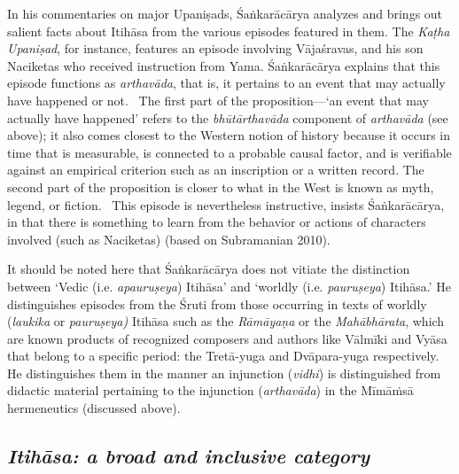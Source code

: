 In his commentaries on major Upaniṣads, Śaṅkarācārya analyzes and brings out salient facts about Itihāsa from the various episodes featured in them. The \textit{Kaṭha Upaniṣad}, for instance, features an episode involving Vājaśravas, and his son Naciketas who received instruction from Yama. Śaṅkarācārya explains that this episode functions as \textit{arthavāda}, that is, it pertains to an event that may actually have happened or not.  The first part of the proposition—‘an event that may actually have happened’ refers to the \textit{bhūtārthavāda} component of \textit{arthavāda} (see above); it also comes closest to the Western notion of history because it occurs in time that is measurable, is connected to a probable causal factor, and is verifiable against an empirical criterion such as an inscription or a written record. The second part of the proposition is closer to what in the West is known as myth, legend, or fiction.  This episode is nevertheless instructive, insists Śaṅkarācārya, in that there is something to learn from the behavior or actions of characters involved (such as Naciketas) (based on Subramanian 2010). 

It should be noted here that Śaṅkarācārya does not vitiate the distinction between ‘Vedic (i.e. \textit{apauruṣeya}) Itihāsa’ and ‘worldly (i.e. \textit{pauruṣeya}) Itihāsa.’ He distinguishes episodes from the Śruti from those occurring in texts of worldly (\textit{laukika} or \textit{pauruṣeya)} Itihāsa such as the \textit{Rāmāyaṇa} or the \textit{Mahābhārata}, which are known products of recognized composers and authors like Vālmīki and Vyāsa that belong to a specific period: the Tretā-yuga and Dvāpara-yuga respectively. He distinguishes them in the manner an injunction (\textit{vidhi}) is distinguished from didactic material pertaining to the injunction (\textit{arthavāda}) in the Mīmāṁsā hermeneutics (discussed above).


\subsection*{\textit{Itihāsa: a broad and inclusive category}}

